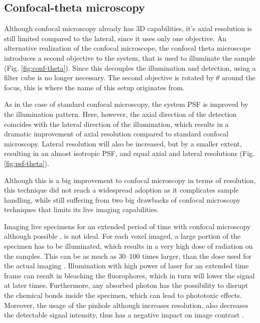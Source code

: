   \subsection{Confocal-theta microscopy}

    Although confocal microscopy already has 3D capabilities, it's axial resolution is still limited compared to the lateral, since it uses only one objective. An alternative realization of the confocal microscope, the confocal theta microscope \cite{stelzer_fundamental_1994} introduces a second objective to the system, that is used to illuminate the sample (Fig. \ref{fig:conf-theta}). Since this decouples the illumination and detection, using a filter cube is no longer necessary. The second objective is rotated by $\theta$ around the focus, this is where the name of this setup originates from.

    As in the case of standard confocal microscopy, the system PSF is improved by the illumination pattern. Here, however, the axial direction of the detection coincides with the lateral direction of the illumination, which results in a dramatic improvement of axial resolution compared to standard confocal microscopy. Lateral resolution will also be increased, but by a smaller extent, resulting in an almost isotropic PSF, and equal axial and lateral resolutions (Fig. \ref{fig:psf-theta}). 

    Although this is a big improvement to confocal microscopy in terms of resolution, this technique did not reach a widespread adoption as it complicates sample handling, while still suffering from two big drawbacks of confocal microscopy techniques that limits its live imaging capabilities.

    Imaging live specimens for an extended period of time with confocal microscopy although possible \cite{aldaz_live_2010, maitre_asymmetric_2016}, is not ideal. For each voxel imaged, a large portion of the specimen has to be illuminated, which results in a very high dose of radiation on the samples. This can be as much as 30--100 times larger, than the dose used for the actual imaging \cite{reynaud_light_2008}. Illumination with high power of laser for an extended time frame can result in bleaching the fluorophores, which in turn will lower the signal at later times. Furthermore, any absorbed photon has the possibility to disrupt the chemical bonds inside the specimen, which can lead to phototoxic effects. Moreover, the usage of the pinhole although increases resolution, also decreases the detectable signal intensity, thus has a negative impact on image contrast \cite{stelzer_contrast_1998}.


